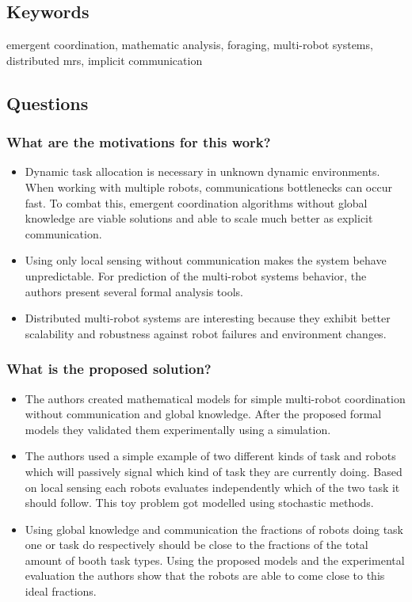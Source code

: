 \subsection*{Keywords}
emergent coordination, mathematic analysis, foraging, multi-robot systems, distributed mrs, implicit communication

\subsection*{Questions}
\subsubsection*{What are the motivations for this work?}
\begin{itemize}
    \item Dynamic task allocation is necessary in unknown dynamic environments. When working with multiple robots, communications bottlenecks can occur fast. To combat this, emergent coordination algorithms without global knowledge are viable solutions and able to scale much better as explicit communication.
    \item Using only local sensing without communication makes the system behave unpredictable. For prediction of the multi-robot systems behavior, the authors present several formal analysis tools. 
    \item Distributed multi-robot systems are interesting because they exhibit better scalability and robustness against robot failures and environment changes. 
\end{itemize}
\subsubsection*{What is the proposed solution?}
\begin{itemize}
    \item The authors created mathematical models for simple multi-robot coordination without communication and global knowledge. After the proposed formal models they validated them experimentally using a simulation.
    \item The authors used a simple example of two different kinds of task and robots which will passively signal which kind of task they are currently doing. Based on local sensing each robots evaluates independently which of the two task it should follow. This toy problem got modelled using  stochastic methods.
    \item Using global knowledge and communication the fractions of robots doing task one or task do respectively should be close to the fractions of the total amount of booth task types. Using the proposed models and the experimental evaluation the authors show that the robots are able to come close to this ideal fractions.
\end{itemize}
